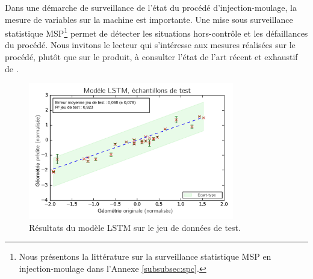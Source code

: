 Dans une démarche de surveillance de l'état du procédé d'injection-moulage, la mesure de variables sur la machine est importante.
Une mise sous surveillance statistique MSP\footnote{Nous présentons la littérature sur la surveillance statistique MSP en injection-moulage dans l'Annexe \ref{subsubsec:spc}.} permet de détecter les situations hors-contrôle et les défaillances du procédé.
Nous invitons le lecteur qui s'intéresse aux mesures réalisées sur le procédé, plutôt que sur le produit, à consulter l'état de l'art récent et exhaustif de \citeauthor{ageyeva_inmold_2019} \cite{ageyeva_inmold_2019}.

\begin{figure}[bthp]
	\centering
	\includegraphics[width=0.8\textwidth]{../Chap2/Figures/1LSTM_Cross_val_MSE_013splited_Ystd.png}
	\caption{Résultats du modèle LSTM sur le jeu de données de test.}
	\label{fig:signals_lstm}
\end{figure}


